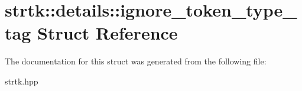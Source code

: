 \hypertarget{structstrtk_1_1details_1_1ignore__token__type__tag}{\section{strtk\-:\-:details\-:\-:ignore\-\_\-token\-\_\-type\-\_\-tag Struct Reference}
\label{structstrtk_1_1details_1_1ignore__token__type__tag}
}


The documentation for this struct was generated from the following file\-:\begin{DoxyCompactItemize}
\item 
strtk.\-hpp\end{DoxyCompactItemize}
